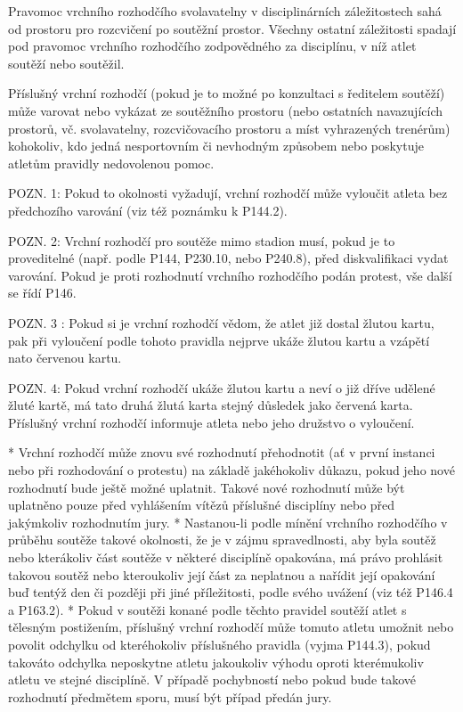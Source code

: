 Pravomoc vrchního rozhodčího svolavatelny v disciplinárních záležitostech sahá od prostoru pro rozcvičení po soutěžní prostor. Všechny ostatní záležitosti spadají pod pravomoc vrchního rozhodčího zodpovědného za disciplínu, v níž atlet soutěží nebo soutěžil.

Příslušný vrchní rozhodčí (pokud je to možné po konzultaci s ředitelem soutěží) může varovat nebo vykázat ze soutěžního prostoru (nebo ostatních navazujících prostorů, vč. svolavatelny, rozcvičovacího prostoru a míst vyhrazených trenérům) kohokoliv, kdo jedná nesportovním či nevhodným způsobem nebo poskytuje atletům pravidly nedovolenou pomoc.

POZN. 1: Pokud to okolnosti vyžadují, vrchní rozhodčí může vyloučit atleta bez předchozího varování (viz též poznámku k P144.2).

POZN. 2: Vrchní rozhodčí pro soutěže mimo stadion musí, pokud je to proveditelné (např. podle P144, P230.10, nebo P240.8), před diskvalifikaci vydat varování. Pokud je proti rozhodnutí vrchního rozhodčího podán protest, vše další se řídí P146.

POZN. 3 : Pokud si je vrchní rozhodčí vědom, že atlet již dostal žlutou kartu, pak při vyloučení podle tohoto pravidla nejprve ukáže žlutou kartu a vzápětí nato červenou kartu.

POZN. 4: Pokud vrchní rozhodčí ukáže žlutou kartu a neví o již dříve udělené žluté kartě, má tato druhá žlutá karta stejný důsledek jako červená karta. Příslušný vrchní rozhodčí informuje atleta nebo jeho družstvo o vyloučení.

* Vrchní rozhodčí může znovu své rozhodnutí přehodnotit (ať v první instanci nebo při rozhodování o protestu) na základě jakéhokoliv důkazu, pokud jeho nové rozhodnutí bude ještě možné uplatnit. Takové nové rozhodnutí může být uplatněno pouze před vyhlášením vítězů příslušné disciplíny nebo před jakýmkoliv rozhodnutím jury.
* Nastanou-li podle mínění vrchního rozhodčího v průběhu soutěže takové okolnosti, že je v zájmu spravedlnosti, aby byla soutěž nebo kterákoliv část soutěže v některé disciplíně opakována, má právo prohlásit takovou soutěž nebo kteroukoliv její část za neplatnou a nařídit její opakování buď tentýž den či později při jiné příležitosti, podle svého uvážení (viz též P146.4 a P163.2).
* Pokud v soutěži konané podle těchto pravidel soutěží atlet s tělesným postižením, příslušný vrchní rozhodčí může tomuto atletu umožnit nebo povolit odchylku od kteréhokoliv příslušného pravidla (vyjma P144.3), pokud takováto odchylka neposkytne atletu jakoukoliv výhodu oproti kterémukoliv atletu ve stejné disciplíně. V případě pochybností nebo pokud bude takové rozhodnutí předmětem sporu, musí být případ předán jury.

